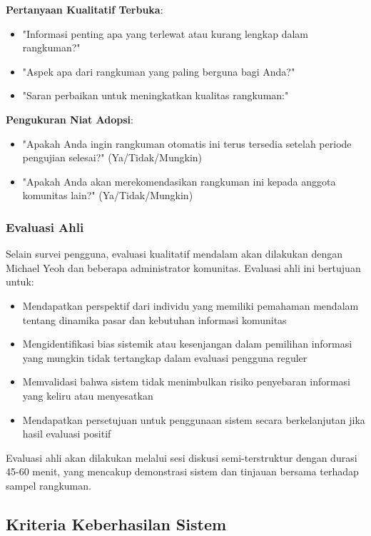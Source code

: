 \textbf{Pertanyaan Kualitatif Terbuka}:
\begin{itemize}
\item "Informasi penting apa yang terlewat atau kurang lengkap dalam rangkuman?"
\item "Aspek apa dari rangkuman yang paling berguna bagi Anda?"
\item "Saran perbaikan untuk meningkatkan kualitas rangkuman:"
\end{itemize}

\textbf{Pengukuran Niat Adopsi}:
\begin{itemize}
\item "Apakah Anda ingin rangkuman otomatis ini terus tersedia setelah periode pengujian selesai?" (Ya/Tidak/Mungkin)
\item "Apakah Anda akan merekomendasikan rangkuman ini kepada anggota komunitas lain?" (Ya/Tidak/Mungkin)
\end{itemize}

\subsubsection{Evaluasi Ahli}

Selain survei pengguna, evaluasi kualitatif mendalam akan dilakukan dengan Michael Yeoh dan beberapa administrator komunitas. Evaluasi ahli ini bertujuan untuk:

\begin{itemize}
\item Mendapatkan perspektif dari individu yang memiliki pemahaman mendalam tentang dinamika pasar dan kebutuhan informasi komunitas
\item Mengidentifikasi bias sistemik atau kesenjangan dalam pemilihan informasi yang mungkin tidak tertangkap dalam evaluasi pengguna reguler
\item Memvalidasi bahwa sistem tidak menimbulkan risiko penyebaran informasi yang keliru atau menyesatkan
\item Mendapatkan persetujuan untuk penggunaan sistem secara berkelanjutan jika hasil evaluasi positif
\end{itemize}

Evaluasi ahli akan dilakukan melalui sesi diskusi semi-terstruktur dengan durasi 45-60 menit, yang mencakup demonstrasi sistem dan tinjauan bersama terhadap sampel rangkuman.

\subsection{Kriteria Keberhasilan Sistem}

